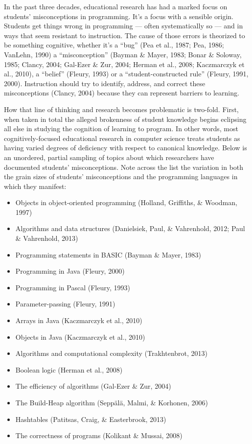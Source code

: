 In the past three decades, educational research has had a marked focus
on students' misconceptions in programming. It's a focus with a sensible
origin. Students get things wrong in programming --- often
systematically so --- and in ways that seem resistant to instruction.
The cause of those errors is theorized to be something cognitive,
whether it's a ``bug'' (Pea et al., 1987; Pea, 1986; VanLehn, 1990) a
``misconception'' (Bayman \& Mayer, 1983; Bonar \& Soloway, 1985;
Clancy, 2004; Gal-Ezer \& Zur, 2004; Herman et al., 2008; Kaczmarczyk et
al., 2010), a ``belief'' (Fleury, 1993) or a ``student-constructed
rule'' (Fleury, 1991, 2000). Instruction should try to identify,
address, and correct these misconceptions (Clancy, 2004) because they
can represent barriers to learning.

How that line of thinking and research becomes problematic is two-fold.
First, when taken in total the alleged brokenness of student knowledge
begins eclipsing all else in studying the cognition of learning to
program. In other words, most cognitively-focused educational research
in computer science treats students as having varied degrees of
deficiency with respect to canonical knowledge. Below is an unordered,
partial sampling of topics about which researchers have documented
students' misconceptions. Note across the list the variation in both the
grain sizes of students' misconceptions and the programming languages in
which they manifest:

\begin{itemize}
\item
  Objects in object-oriented programming (Holland, Griffiths, \&
  Woodman, 1997)
\item
  Algorithms and data structures (Danielsiek, Paul, \& Vahrenhold, 2012;
  Paul \& Vahrenhold, 2013)
\item
  Programming statements in BASIC (Bayman \& Mayer, 1983)
\item
  Programming in Java (Fleury, 2000)
\item
  Programming in Pascal (Fleury, 1993)
\item
  Parameter-passing (Fleury, 1991)
\item
  Arrays in Java (Kaczmarczyk et al., 2010)
\item
  Objects in Java (Kaczmarczyk et al., 2010)
\item
  Algorithms and computational complexity (Trakhtenbrot, 2013)
\item
  Boolean logic (Herman et al., 2008)
\item
  The efficiency of algorithms (Gal-Ezer \& Zur, 2004)
\item
  The Build-Heap algorithm (Seppälä, Malmi, \& Korhonen, 2006)
\item
  Hashtables (Patitsas, Craig, \& Easterbrook, 2013)
\item
  The correctness of programs (Kolikant \& Mussai, 2008)
\end{itemize}

